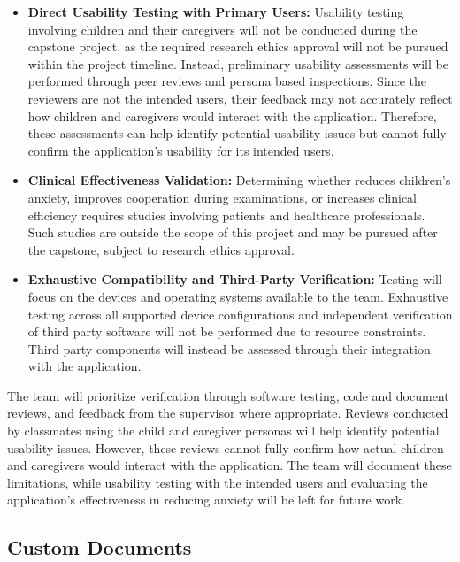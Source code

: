 \documentclass[10pt,titlepage]{article}
\begin{document}
\begin{itemize}
    \item \textbf{Direct Usability Testing with Primary Users:}
    Usability testing involving children and their caregivers
    will not be conducted during the capstone project, as
    the required research ethics approval will not be pursued
    within the project timeline. Instead, preliminary usability
    assessments will be performed through peer reviews and
    persona based inspections. Since the reviewers are not the intended users, their feedback
    may not accurately reflect how children and caregivers would
    interact with the application. Therefore, these assessments
    can help identify potential usability issues but cannot fully
    confirm the application's usability for its intended users.

    \item \textbf{Clinical Effectiveness Validation:}
    Determining whether \progname{} reduces children's anxiety,
    improves cooperation during examinations, or increases
    clinical efficiency requires studies involving patients
    and healthcare professionals. Such studies are outside
    the scope of this project and may be pursued after the
    capstone, subject to research ethics approval.

    \item \textbf{Exhaustive Compatibility and Third-Party
    Verification:}
    Testing will focus on the devices and operating systems
    available to the team. Exhaustive testing across all
    supported device configurations and independent verification
    of third party software will not be performed due to
    resource constraints. Third party components will instead
    be assessed through their integration with the application.
\end{itemize}

The team will prioritize verification through software testing,
code and document reviews, and feedback from the supervisor where
appropriate. Reviews conducted by classmates using the child and caregiver
personas will help identify potential usability issues. However,
these reviews cannot fully confirm how actual children and
caregivers would interact with the application. The team will
document these limitations, while usability testing with the
intended users and evaluating the application's effectiveness
in reducing anxiety will be left for future work.

\subsection{Custom Documents}
\end{document}
